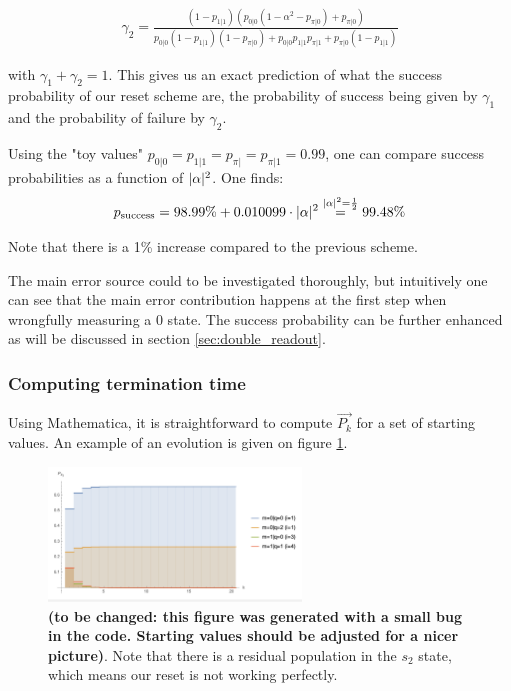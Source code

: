 \begin{equation}
    \begin{split}
       \gamma_2 = \frac{(1-p_{1|1}) \left(p_{0|0} \left(1-\alpha ^2-p_{\pi|0}\right)+p_{\pi|0}\right)}{p_{0|0} (1-p_{1|1}) (1-p_{\pi|0})+p_{0|0} p_{1|1} p_{\pi|1} + p_{\pi|0}(1-p_{1|1})}
    \end{split}
\end{equation}

with $\gamma_1 + \gamma_2 = 1$. This gives us an exact prediction of what the success probability of our reset scheme are, the probability of success being given by $\gamma_1$ and the probability of failure by $\gamma_2$.

Using the "toy values" $p_{0|0} = p_{1|1} = p_{\pi|} = p_{\pi|1} = 0.99$, one can compare success probabilities as a function of $\lvert \alpha \rvert^2$. One finds:
\begin{equation}
    p_\text{success} = 98.99 \% + 0.010099 \cdot \lvert \alpha \rvert^2 \overset{\lvert \alpha \rvert^2 = \frac{1}{2}}{=} 99.48 \%
\end{equation}



Note that there is a 1\% increase compared to the previous scheme. 

The main error source could to be investigated thoroughly, but intuitively one can see that the main error contribution happens at the first step when wrongfully measuring a 0 state. The success probability can be further enhanced as will be discussed in section \ref{sec:double_readout}.  

\subsubsection{Computing termination time}

Using Mathematica, it is straightforward to compute $\Vec{P_k}$ for a set of starting values. An example of an evolution is given on figure \ref{fig:p_k}.

\begin{figure}[h]
    \centering
    \includegraphics[width=0.6\textwidth]{state_prop_evol_i=4.png}
    \caption{\textbf{(to be
    changed: this figure was generated with a small bug in the code. Starting values should be adjusted for a nicer picture)}. Note that there is a residual population in the $s_2$ state, which means our reset is not working perfectly. }
    \label{fig:p_k}
\end{figure}


